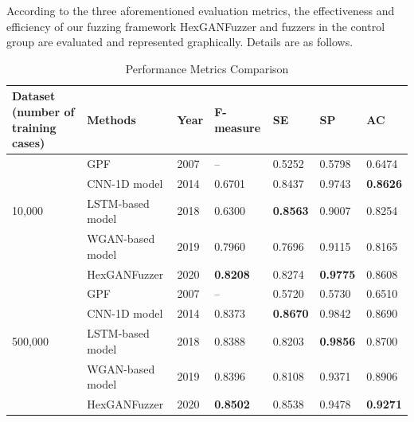 According to the three aforementioned evaluation metrics, the effectiveness and efficiency of our fuzzing framework HexGANFuzzer and fuzzers in the control group are evaluated and represented graphically. Details are as follows.  

\begin{table}[]
	\centering
	\caption{Performance Metrics Comparison}
	\label{F-measure}
	\renewcommand{\arraystretch}{1.35}
	\begin{tabular}{ m{70pt}<{\centering} |m{70pt}<{\centering}|m{40pt}<{\centering}|m{60pt}<{\centering}|m{40pt}<{\centering}|m{40pt}<{\centering}|m{40pt}<{\centering}}
		\toprule
		\textbf{Dataset
			(number of training cases)} & \textbf{Methods}          & \textbf{Year} & \textbf{F-measure} & \textbf{SE}     & \textbf{SP}     & \textbf{AC}     \\ \midrule
		& GPF              & 2007 & --         & 0.5252 & 0.5798 & 0.6474 \\ \cmidrule(l){2-7} 
		& CNN-1D model     & 2014 & 0.6701    & 0.8437 & 0.9743 & \textbf{0.8626} \\ \cmidrule(l){2-7} 
		10,000  & LSTM-based model & 2018 & 0.6300    & \textbf{0.8563}   & 0.9007 & 0.8254 \\ \cmidrule(l){2-7} 
		& WGAN-based model & 2019 & 0.7960    & 0.7696 & 0.9115 & 0.8165 \\ \cmidrule(l){2-7} 
		& HexGANFuzzer      & 2020 & \textbf{0.8208}    & 0.8274 & \textbf{0.9775} & 0.8608 \\ \midrule
		& GPF              & 2007 & --         & 0.5720 & 0.5730 & 0.6510 \\ \cmidrule(l){2-7} 
		& CNN-1D model     & 2014 & 0.8373    & \textbf{0.8670} & 0.9842 & 0.8690 \\ \cmidrule(l){2-7} 
		500,000 & LSTM-based model & 2018 & 0.8388    & 0.8203 & \textbf{0.9856} & 0.8700 \\ \cmidrule(l){2-7} 
		& WGAN-based model & 2019 & 0.8396    & 0.8108 & 0.9371 & 0.8906 \\ \cmidrule(l){2-7} 
		& HexGANFuzzer      & 2020 & \textbf{0.8502}    & 0.8538 & 0.9478 & \textbf{0.9271} \\ \bottomrule
	\end{tabular}
\end{table}

